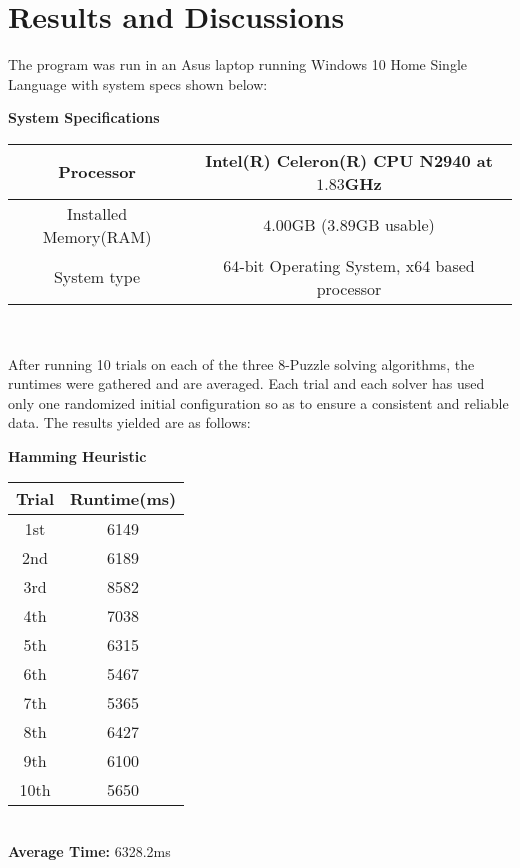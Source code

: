 \section{Results and Discussions}
	The program was run in an Asus laptop running Windows 10 Home Single Language with system specs shown below:
	\begin{center}
	\textbf{System Specifications}\\
	\begin{tabular}{ |c|c| } 
	\hline
	Processor & Intel(R) Celeron(R) CPU N2940 at $1.83$GHz \\
	\hline
	Installed Memory(RAM) & $4.00$GB ($3.89$GB usable) \\
	\hline
	System type & $64$-bit Operating System, x$64$ based processor \\
	\hline
	\end{tabular} \\
	\end{center}
	After running 10 trials on each of the three 8-Puzzle solving algorithms, the runtimes were gathered and are averaged. Each trial and each solver has used only one randomized initial configuration so as to ensure a consistent and reliable data. The results yielded are as follows:
	\begin{center}
	\textbf{Hamming Heuristic}\\
	\begin{tabular}{ |c|c| } 
	\hline
	Trial & Runtime(ms) \\
	\hline
	\multirow{1}{3em}{1st}
	& 6149 \\
	\hline
	\multirow{1}{3em}{2nd}
	& 6189 \\
	\hline
	\multirow{1}{3em}{3rd}
	& 8582 \\
	\hline
	\multirow{1}{3em}{4th}
	& 7038 \\
	\hline
	\multirow{1}{3em}{5th}
	& 6315 \\
	\hline
	\multirow{1}{3em}{6th}
	& 5467 \\
	\hline
	\multirow{1}{3em}{7th}
	& 5365 \\
	\hline
	\multirow{1}{3em}{8th}
	& 6427 \\
	\hline
	\multirow{1}{3em}{9th}
	& 6100 \\
	\hline
	\multirow{1}{3em}{10th}
	& 5650 \\
	\hline
	\end{tabular} \\
	\textbf{Average Time:} 6328.2ms \\
	\end{center}

